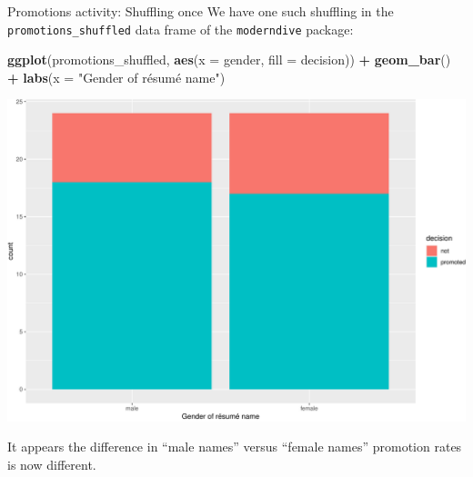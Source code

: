\documentclass[
  ignorenonframetext,
]{beamer}
\newenvironment{Shaded}{\begin{snugshade}}{\end{snugshade}}
\newcommand{\AttributeTok}[1]{\textcolor[rgb]{0.13,0.29,0.53}{#1}}
\newcommand{\FunctionTok}[1]{\textcolor[rgb]{0.13,0.29,0.53}{\textbf{#1}}}
\newcommand{\NormalTok}[1]{#1}
\newcommand{\SpecialCharTok}[1]{\textcolor[rgb]{0.81,0.36,0.00}{\textbf{#1}}}
\newcommand{\StringTok}[1]{\textcolor[rgb]{0.31,0.60,0.02}{#1}}
\begin{document}
\begin{frame}[fragile]{Promotions activity: Shuffling once}
\protect\hypertarget{promotions-activity-shuffling-once-4}{}
We have one such shuffling in the \texttt{promotions\_shuffled} data
frame of the \texttt{moderndive} package:

\tiny

\begin{Shaded}
\begin{Highlighting}[]
\FunctionTok{ggplot}\NormalTok{(promotions\_shuffled, }
       \FunctionTok{aes}\NormalTok{(}\AttributeTok{x =}\NormalTok{ gender, }\AttributeTok{fill =}\NormalTok{ decision)) }\SpecialCharTok{+}
  \FunctionTok{geom\_bar}\NormalTok{() }\SpecialCharTok{+} 
  \FunctionTok{labs}\NormalTok{(}\AttributeTok{x =} \StringTok{"Gender of résumé name"}\NormalTok{)}
\end{Highlighting}
\end{Shaded}

\begin{center}\includegraphics[width=0.7\linewidth,height=0.4\textheight]{Week11_12_13_files/figure-beamer/unnamed-chunk-43-1} \end{center}
\normalsize

It appears the difference in ``male names'' versus ``female names''
promotion rates is now different.
\end{frame}
\end{document}
